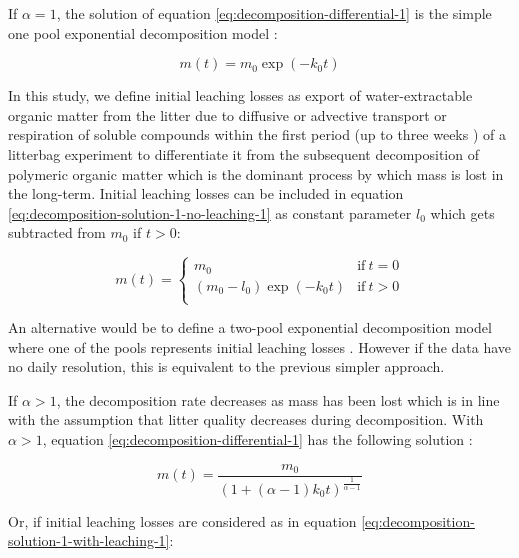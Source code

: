 \documentclass[bg, manuscript]{copernicus}
\begin{document}
If \(\alpha = 1\), the solution of equation \eqref{eq:decomposition-differential-1} is the simple one pool exponential decomposition model \citep{Frolking.2001}:

\begin{equation}
m(t) = m_0 \exp(-k_0 t)
\label{eq:decomposition-solution-1-no-leaching-1}
\end{equation}

In this study, we define initial leaching losses as export of water-extractable organic matter from the litter due to diffusive or advective transport or respiration of soluble compounds within the first period (up to three weeks \citep{Coulson.1978, Thormann.2001, Moore.2001, Kim.2014, Muller.2023}) of a litterbag experiment to differentiate it from the subsequent decomposition of polymeric organic matter which is the dominant process by which mass is lost in the long-term. Initial leaching losses can be included in equation \eqref{eq:decomposition-solution-1-no-leaching-1} as constant parameter \(l_0\) which gets subtracted from \(m_0\) if \(t>0\):

\begin{equation}
m(t) = \begin{cases}
m_0 & \mathrm{if}~t=0\\
(m_0 - l_0) \exp(-k_0 t) & \mathrm{if}~t>0\\
\end{cases}
\label{eq:decomposition-solution-1-with-leaching-1}
\end{equation}

An alternative would be to define a two-pool exponential decomposition model where one of the pools represents initial leaching losses \citep[e.g.][]{Yu.2001, Rovira.2010, Hagemann.2015}. However if the data have no daily resolution, this is equivalent to the previous simpler approach.

If \(\alpha>1\), the decomposition rate decreases as mass has been lost which is in line with the assumption that litter quality decreases during decomposition. With \(\alpha>1\), equation \eqref{eq:decomposition-differential-1} has the following solution \citep{Frolking.2001}:

\begin{equation}
m(t) = \frac{m_0}{(1 + (\alpha - 1) k_0 t)^{\frac{1}{\alpha - 1}}}
\label{eq:decomposition-solution-2-no-leaching-1}
\end{equation}

Or, if initial leaching losses are considered as in equation \eqref{eq:decomposition-solution-1-with-leaching-1}:
\end{document}

